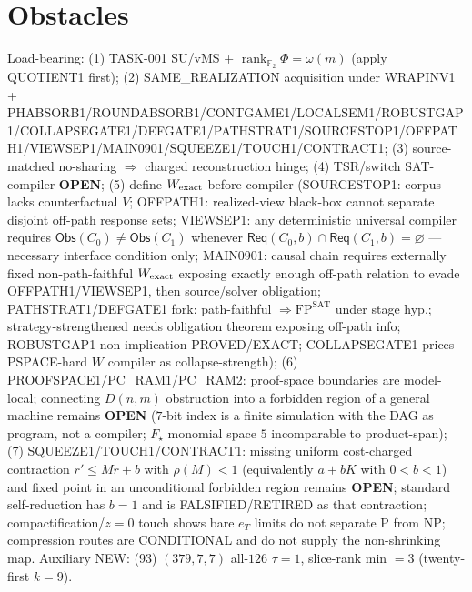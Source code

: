 \documentclass[11pt]{article}
\begin{document}
\section*{Obstacles}
Load-bearing: (1) TASK-001 SU/vMS + $\operatorname{rank}_{\mathbb F_2}\Phi=\omega(m)$ (apply QUOTIENT1 first);
(2) SAME\_REALIZATION acquisition under WRAPINV1 + PHABSORB1/ROUNDABSORB1/CONTGAME1/LOCALSEM1/ROBUSTGAP1/COLLAPSEGATE1/DEFGATE1/PATHSTRAT1/SOURCESTOP1/OFFPATH1/VIEWSEP1/MAIN0901/SQUEEZE1/TOUCH1/CONTRACT1;
(3) source-matched no-sharing $\Rightarrow$ charged reconstruction hinge;
(4) TSR/switch SAT-compiler \textbf{OPEN};
(5) define $W_{\rm exact}$ before compiler (SOURCESTOP1: corpus lacks counterfactual $V$;
OFFPATH1: realized-view black-box cannot separate disjoint off-path response sets;
VIEWSEP1: any deterministic universal compiler requires $\mathsf{Obs}(C_0)\ne\mathsf{Obs}(C_1)$
whenever $\mathsf{Req}(C_0,b)\cap\mathsf{Req}(C_1,b)=\varnothing$ --- necessary interface condition only;
MAIN0901: causal chain requires externally fixed non-path-faithful $W_{\rm exact}$ exposing
exactly enough off-path relation to evade OFFPATH1/VIEWSEP1, then source/solver obligation;
PATHSTRAT1/DEFGATE1 fork: path-faithful $\Rightarrow\mathrm{FP}^{\mathrm{SAT}}$ under stage hyp.;
strategy-strengthened needs obligation theorem exposing off-path info;
ROBUSTGAP1 non-implication PROVED/EXACT; COLLAPSEGATE1 prices PSPACE-hard $W$ compiler as collapse-strength);
(6) PROOFSPACE1/PC\_RAM1/PC\_RAM2: proof-space boundaries are model-local; connecting $D(n,m)$ obstruction into a
forbidden region of a general machine remains \textbf{OPEN} ($7$-bit index is a finite simulation with the DAG as program, not a compiler; $F_\star$ monomial space $5$ incomparable to product-span);
(7) SQUEEZE1/TOUCH1/CONTRACT1: missing uniform cost-charged contraction $r'\le Mr+b$ with $\rho(M){<}1$ (equivalently $a+bK$ with $0{<}b{<}1$) and fixed point in an unconditional forbidden region remains \textbf{OPEN};
standard self-reduction has $b{=}1$ and is FALSIFIED/RETIRED as that contraction; compactification/$z{=}0$ touch shows bare $e_T$ limits do not separate P from NP;
compression routes are CONDITIONAL and do not supply the non-shrinking map.
Auxiliary NEW: (93) $(379,7,7)$ all-$126$ $\tau{=}1$, slice-rank min $=3$ (twenty-first $k{=}9$).
\end{document}

